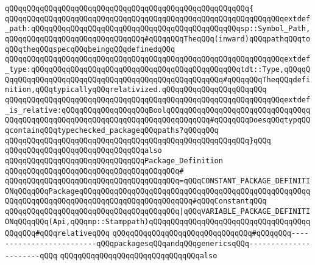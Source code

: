 \verb|qQQqqQQqqQQqqQQqqQQqqQQqqQQqqQQqqQQqqQQqqQQqqQQqqQQqqQQq{|\newline
\verb|qQQqqQQqqQQqqQQqqQQqqQQqqQQqqQQqqQQqqQQqqQQqqQQqqQQqqQQqqQQqqQQqextdef_path:qQQqqQQqqQQqqQQqqQQqqQQqqQQqqQQqqQQqqQQqqQQqqQQqsp::Symbol_Path,qQQqqQQqqQQqqQQqqQQqqQQqqQQqqQQq#qQQqqQQqTheqQQq(inward)qQQqpathqQQqtoqQQqtheqQQqspecqQQqbeingqQQqdefinedqQQq|\newline
\verb|qQQqqQQqqQQqqQQqqQQqqQQqqQQqqQQqqQQqqQQqqQQqqQQqqQQqqQQqqQQqqQQqextdef_type:qQQqqQQqqQQqqQQqqQQqqQQqqQQqqQQqqQQqqQQqqQQqqQQqtdt::Type,qQQqqQQqqQQqqQQqqQQqqQQqqQQqqQQqqQQqqQQqqQQqqQQqqQQqqQQq#qQQqqQQqTheqQQqdefinition,qQQqtypicallyqQQqrelativized.qQQqqQQqqQQqqQQqqQQqqQQq|\newline
\verb|qQQqqQQqqQQqqQQqqQQqqQQqqQQqqQQqqQQqqQQqqQQqqQQqqQQqqQQqqQQqqQQqextdef_is_relative:qQQqqQQqqQQqqQQqqQQqBoolqQQqqQQqqQQqqQQqqQQqqQQqqQQqqQQqqQQqqQQqqQQqqQQqqQQqqQQqqQQqqQQqqQQqqQQqqQQqqQQq#qQQqqQQqDoesqQQqtypqQQqcontainqQQqtypechecked_packageqQQqpaths?qQQqqQQq|\newline
\verb|qQQqqQQqqQQqqQQqqQQqqQQqqQQqqQQqqQQqqQQqqQQqqQQqqQQqqQQq}qQQq|\newline
\newline
\newline
\newline
\newline
\verb|qQQqqQQqqQQqqQQqqQQqqQQqqQQqqQQqalso|\newline
\verb|qQQqqQQqqQQqqQQqqQQqqQQqqQQqqQQqPackage_Definition|\newline
\verb|qQQqqQQqqQQqqQQqqQQqqQQqqQQqqQQqqQQqqQQq#|\newline
\verb|qQQqqQQqqQQqqQQqqQQqqQQqqQQqqQQqqQQqqQQq=qQQqCONSTANT_PACKAGE_DEFINITIONqQQqqQQqPackageqQQqqQQqqQQqqQQqqQQqqQQqqQQqqQQqqQQqqQQqqQQqqQQqqQQqqQQqqQQqqQQqqQQqqQQqqQQqqQQqqQQqqQQqqQQqqQQq#qQQqConstantqQQq|\newline
\verb|qQQqqQQqqQQqqQQqqQQqqQQqqQQqqQQqqQQqqQQq|\verb#|qQQqVARIABLE_PACKAGE_DEFINITIONqQQqqQQq(Api,qQQqmp::Stamppath)qQQqqQQqqQQqqQQqqQQqqQQqqQQqqQQqqQQqqQQqqQQq#\verb|#qQQqrelativeqQQq|\newline
\newline
\newline
\newline
\newline
\verb|qQQqqQQqqQQqqQQqqQQqqQQqqQQqqQQq#qQQqqQQq-------------------------qQQqpackagesqQQqandqQQqgenericsqQQq----------------------qQQq|\newline
\newline
\verb|qQQqqQQqqQQqqQQqqQQqqQQqqQQqqQQqalso|\newline

